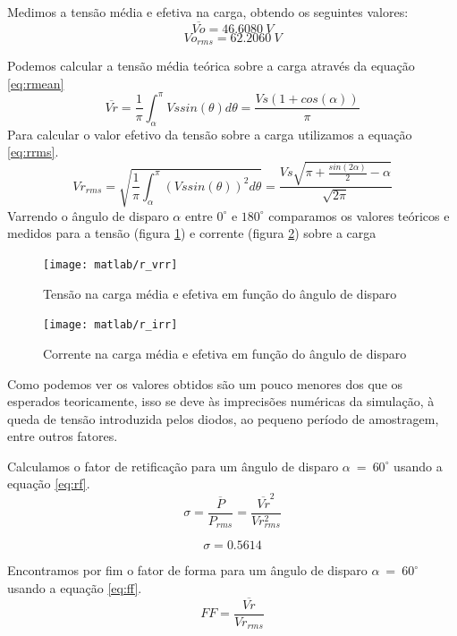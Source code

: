 \documentclass{article}
\begin{document}
Medimos a tensão média e efetiva na carga, obtendo os seguintes valores:
\begin{equation}
\overline{Vo} = 46.6080\ V
\end{equation}
\begin{equation}
Vo_{rms} =  62.2060\ V
\end{equation}

Podemos calcular a tensão média teórica sobre a carga através da equação \ref{eq:rmean}
\begin{equation}
	\overline{Vr} = \frac{1}{\pi} \int_{\alpha}^{\pi}{Vs sin(\theta)d\theta} = \frac{Vs (1 + cos(\alpha))}{\pi}
	\label{eq:rmean}
\end{equation}
Para calcular o valor efetivo da tensão sobre a carga utilizamos a equação \ref{eq:rrms}.
\begin{equation}
	Vr_{rms} = \sqrt{\frac{1}{\pi} \int_{\alpha}^{\pi}{(Vs sin(\theta))^2 d\theta}} = \frac{Vs \sqrt{\pi + \frac{sin(2\alpha)}{2}- \alpha }}{\sqrt{2 \pi}} 
	\label{eq:rrms}
\end{equation}
Varrendo o ângulo de disparo $\alpha$ entre $0^\circ$ e $180^\circ$ comparamos os valores teóricos e medidos para a tensão (figura \ref{fig:rvrr}) e corrente (figura \ref{fig:rirr}) sobre a carga
\begin{figure}[H]
	\centering
	\texttt{[image: matlab/r\_vrr]}
	\caption{Tensão na carga média e efetiva em função do ângulo de disparo}
	\label{fig:rvrr}
\end{figure}
\begin{figure}[H]
	\centering
	\texttt{[image: matlab/r\_irr]}
	\caption{Corrente na carga média e efetiva em função do ângulo de disparo}
	\label{fig:rirr}
\end{figure}
Como podemos ver os valores obtidos são um pouco menores dos que os esperados teoricamente, isso se deve às imprecisões numéricas da simulação, à queda de tensão introduzida pelos diodos, ao pequeno período de amostragem, entre outros fatores.

Calculamos o fator de retificação para um ângulo de disparo $\alpha\ =\ 60^\circ$ usando a equação \ref{eq:rf}.
\begin{equation}
	\sigma = \frac{\overline{P}}{P_{rms}} = \frac{\overline{Vr}^2}{Vr_{rms}^2}
	\label{eq:rf}
\end{equation}

\begin{equation}
	\sigma = 0.5614
\end{equation}

Encontramos por fim o fator de forma para um ângulo de disparo $\alpha\ =\ 60^\circ$ usando a equação \ref{eq:ff}.
\begin{equation}
FF = \frac{\overline{Vr}}{Vr_{rms}}
\label{eq:ff}
\end{equation}
\end{document}
